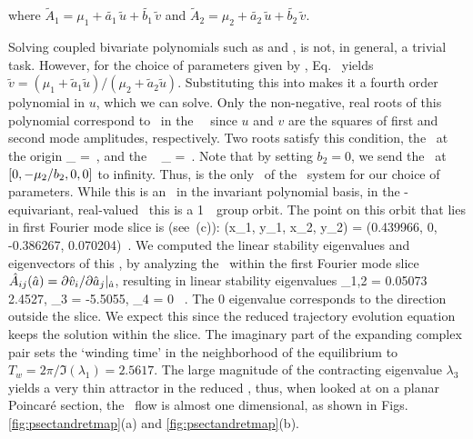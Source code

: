 \documentclass[aip,cha,
reprint,
secnumarabic,
nofootinbib, tightenlines,
nobibnotes, showkeys, showpacs,
superscriptaddress,
]{revtex4-1}
\begin{document}
\noindent where $\tilde{A}_1 = \mu_1+\tilde{a_1}\,\tilde{u}+\tilde{b_1}\,\tilde{v}$ and
$\tilde{A}_2 = \mu_2+\tilde{a_2}\,\tilde{u}+\tilde{b_2}\,\tilde{v}$.

Solving coupled bivariate polynomials such as  and , is not, in general, 
a trivial task. However, for the choice of parameters given by , Eq.~ yields
$\tilde{v} = (\mu_1 + \tilde{a}_1 \tilde{u})/(\mu_2 + \tilde{a}_2
\tilde{u})$. Substituting this into  makes it a fourth order polynomial in $u$,
which we can solve. Only the non-negative, real roots of this polynomial correspond to \reqva\ in the \twomode\
\statesp\ since $u$ and $v$ are the squares of first and second mode amplitudes,
respectively. Two roots satisfy this condition, the \eqv\ at the origin
\beq
	\invpol_{\EQV{}} = \,, %
and the \reqv\
\beq
	\invpol_{\REQV{}{}} = \,.
Note that by setting $b_2 = 0$, we send the \reqv\ at
$\invpt{0,-\mu_2/b_2,0,0}$ to infinity. Thus,  is the
only \reqv\ of the \twomode\ system for our choice of parameters. While
this is an \eqv\ in the invariant polynomial basis, in the
\SOn{2}-equivariant, real-valued \statesp\ this is a 1\dmn\ \reqv\ group orbit.
The point on this orbit that lies in first Fourier mode slice is
(see \refFig{fig:2modes-ssp}\,(c)):
\beq
  \left(x_1, y_1, x_2, y_2\right) = \left(0.439966, 0, -0.386267, 0.070204\right)
\,.
  \label{e-req}
\eeq
We computed the linear stability eigenvalues and eigenvectors of this \reqv
, by analyzing the \stabmat\ within the first Fourier mode slice
$\hat{{A}}_{ij} (\hat{a}) = \partial \hat{{v}}_i / \partial \hat{a}_j |_{\hat{a}}$, 
resulting in linear stability eigenvalues %
\beq
	\lambda_{1,2} = 0.05073 \pm \ii \, 2.4527, \quad
	\lambda_3 = -5.5055, \quad \lambda_4 = 0 \, .
\eeq
The $0$ eigenvalue corresponds to the direction outside the slice. We expect
this since the reduced trajectory evolution equation  keeps the
solution within the slice. The imaginary part of the expanding complex pair sets
the `winding time' in the neighborhood of the equilibrium to
$T_w = 2 \pi / \Im(\lambda_1) = 2.5617$. The large magnitude of the
contracting eigenvalue $\lambda_3$ yields a very thin attractor in the
reduced \statesp, thus, when looked at on a planar Poincar\'{e} section,
the \twomode\ flow is almost one dimensional, as shown in Figs. \ref{fig:psectandretmap}(a) and \ref{fig:psectandretmap}(b).
\end{document}
